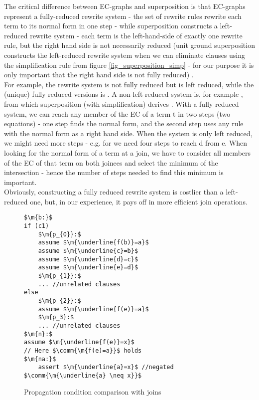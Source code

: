 The critical difference between EC-graphs and superposition is that EC-graphs represent a fully-reduced rewrite system - the set of rewrite rules rewrite each term to its normal form in one step - while superposition constructs a left-reduced rewrite system - each term is the left-hand-side of exactly one rewrite rule, but the right hand side is not necessarily reduced (unit ground superposition constructs the left-reduced rewrite system when we can eliminate clauses using the simplification rule  from figure \ref{fig_superposition_simp} - for our purpose it is only important that the right hand side is not fully reduced) .\\
For example, the rewrite system  is not fully reduced but is left reduced, while the (unique) fully reduced versions is . A non-left-reduced system is, for example , from which superposition (with simplification) derives . With a fully reduced system, we can reach any member of the EC of a term t in two steps (two equations) - one step finds the normal form, and the second step uses any rule with the normal form as a right hand side. When the system is only left reduced, we might need more steps - e.g. for  we need four steps to reach d from e. When looking for the normal form of a term at a join, we have to consider all members of the EC of that term on both joinees and select the minimum of the intersection - hence the number of steps needed to find this minimum is important.\\
Obviously, constructing a fully reduced rewrite system is costlier than a left-reduced one, but, in our experience, it pays off in more efficient join operations.


\begin{figure}
\begin{lstlisting}
$\m{b:}$
if (c1)
	$\m{p_{0}}:$
	assume $\m{\underline{f(b)}=a}$
	assume $\m{\underline{c}=b}$
	assume $\m{\underline{d}=c}$
	assume $\m{\underline{e}=d}$
	$\m{p_{1}}:$
	... //unrelated clauses
else
	$\m{p_{2}}:$
	assume $\m{\underline{f(e)}=a}$
	$\m{p_3}:$
	... //unrelated clauses
$\m{n}:$
assume $\m{\underline{f(e)}=x}$
// Here $\comm{\m{f(e)=a}}$ holds
$\m{na:}$
	assert $\m{\underline{a}=x}$ //negated $\comm{\m{\underline{a} \neq x}}$
\end{lstlisting}
\caption{Propagation condition comparison with joins}
\label{snippet3.14.0}
\end{figure}

